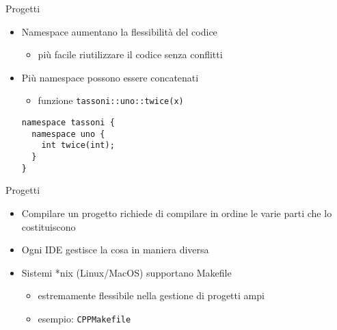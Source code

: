 \begin{frame}[fragile]{Progetti}
  \vfill
  \begin{itemize}
    \item Namespace aumentano la flessibilità del codice
    \begin{itemize}
      \item più facile riutilizzare il codice senza conflitti
    \end{itemize}
    \vfill
    \item Più namespace possono essere concatenati
    \begin{itemize}
      \item funzione \lstinline$tassoni::uno::twice(x)$
    \end{itemize}
    \begin{lstlisting}[firstnumber=3]
namespace tassoni {
  namespace uno {
    int twice(int);
  }
}
  \end{lstlisting}
  \end{itemize}
  \vfill
\end{frame}

\begin{frame}[fragile]{Progetti}
  \vfill
  \begin{itemize}
    \item Compilare un progetto richiede di compilare in ordine le varie parti che
    lo costituiscono
    \vfill
    \item Ogni IDE gestisce la cosa in maniera diversa
    \vfill
    \item Sistemi *nix (Linux/MacOS) supportano \alert{Makefile}
    \begin{itemize}
      \item estremamente flessibile nella gestione di progetti ampi
      \item esempio: \lstinline$CPPMakefile$
    \end{itemize}
  \end{itemize}
  \vfill
\end{frame}

